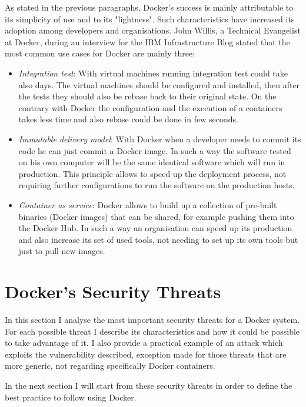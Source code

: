 \documentclass[a4paper,12pt]{article}
\begin{document}
As stated in the previous paragraphs, Docker's success is mainly attributable to
its simplicity of use and to its "lightness". Such characteristics have
increased its adoption among developers and organisations. John Willis, a
Technical Evangelist at Docker, during an interview for the IBM Infrastructure
Blog stated \cite{ibm_interview_john_willis} that the most common use cases for
Docker are mainly three:
\begin{itemize}
  \item \textit{Integration test}: With virtual machines running integration
  test could take also days. The virtual machines should be configured and
  installed, then after the tests they should also be rebase back to their
  original state. On the contrary with Docker the configuration and the
  execution of a containers takes less time and also rebase could be done in few
  seconds.
  \item \textit{Immutable delivery model}: With Docker when a developer needs to
  commit its code he can just commit a Docker image. In such a way the software
  tested on his own computer will be the same identical software which will run
  in production. This principle allows to speed up the deployment process, not
  requiring further configurations to run the software on the production hosts.
  \item \textit{Container as service}: Docker allows to build up a collection of
  pre-built binaries (Docker images) that can be shared, for example pushing
  them into the Docker Hub. In such a way an organisation can speed up its
  production and also increase its set of used tools, not needing to set up its
  own tools but just to pull new images.
  
\end{itemize}


\newpage

\section{Docker's Security Threats}
 
In this section I analyse the most important security threats for a Docker
system. For each possible threat I describe its characteristics and how it could
be possible to take advantage of it. I also provide a practical example of an
attack which exploits the vulnerability described, exception made for those
threats that are more generic, not regarding specifically Docker containers.
\par In the next section I will start from these security threats in order to
define the best practice to follow using Docker.
\end{document}
